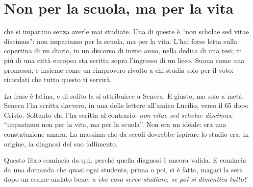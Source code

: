 %
\chapter{Non per la scuola, ma per la vita}
\label{cap:vita}


 che si imparano senza averle mai studiate.
Una di queste è \enquote{non scholae sed vitae discimus}: non impariamo
per la scuola, ma per la vita. L'hai forse letta sulla copertina di un
diario, in un discorso di inizio anno, nella dedica di una tesi; in più
di una città europea sta scritta sopra l'ingresso di un liceo. Suona
come una promessa, e insieme come un rimprovero rivolto a chi studia
solo per il voto: ricordati che tutto questo ti servirà.

La frase è latina, e di solito la si attribuisce a Seneca. È giusto, ma
solo a metà. Seneca l'ha scritta davvero, in una delle lettere
all'amico Lucilio, verso il 65 dopo Cristo. Soltanto che l'ha scritta al
contrario: \emph{non vitae sed scholae discimus}, \enquote{impariamo
non per la vita, ma per la scuola}. Non era un ideale: era una
constatazione amara. La massima che da secoli dovrebbe ispirare lo
studio era, in origine, la diagnosi del suo fallimento.

Questo libro comincia da qui, perché quella diagnosi è ancora valida. E
comincia da una domanda che quasi ogni studente, prima o poi, si è
fatto, magari la sera dopo un esame andato bene: \emph{a che cosa serve
studiare, se poi si dimentica tutto?}

